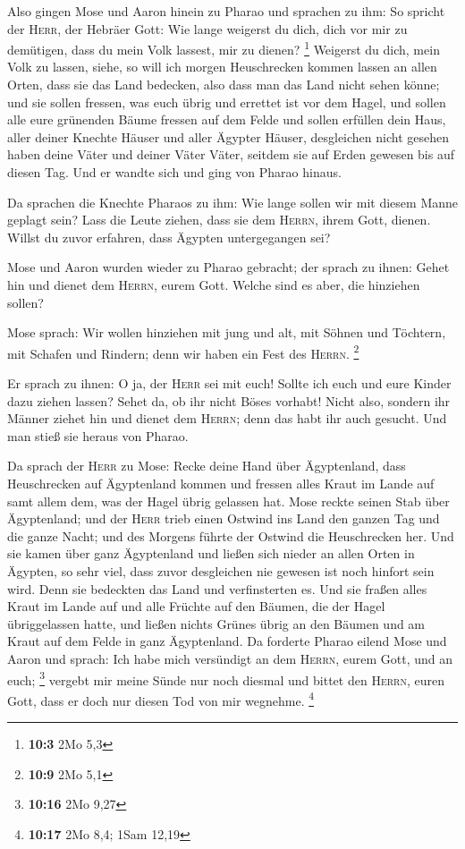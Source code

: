  Also gingen Mose und Aaron hinein zu Pharao und sprachen
zu ihm: So spricht der \textsc{Herr}, der Hebräer Gott: Wie lange
weigerst du dich, dich vor mir zu demütigen, dass du mein Volk lassest,
mir zu dienen? \footnote{\textbf{10:3} 2Mo 5,3}  Weigerst
du dich, mein Volk zu lassen, siehe, so will ich morgen Heuschrecken
kommen lassen an allen Orten,  dass sie das Land bedecken,
also dass man das Land nicht sehen könne; und sie sollen fressen, was
euch übrig und errettet ist vor dem Hagel, und sollen alle eure
grünenden Bäume fressen auf dem Felde  und sollen erfüllen
dein Haus, aller deiner Knechte Häuser und aller Ägypter Häuser,
desgleichen nicht gesehen haben deine Väter und deiner Väter Väter,
seitdem sie auf Erden gewesen bis auf diesen Tag. Und er wandte sich und
ging von Pharao hinaus.

 Da sprachen die Knechte Pharaos zu ihm: Wie lange sollen
wir mit diesem Manne geplagt sein? Lass die Leute ziehen, dass sie dem
\textsc{Herrn}, ihrem Gott, dienen. Willst du zuvor erfahren, dass
Ägypten untergegangen sei?

 Mose und Aaron wurden wieder zu Pharao gebracht; der
sprach zu ihnen: Gehet hin und dienet dem \textsc{Herrn}, eurem Gott.
Welche sind es aber, die hinziehen sollen?

 Mose sprach: Wir wollen hinziehen mit jung und alt, mit
Söhnen und Töchtern, mit Schafen und Rindern; denn wir haben ein Fest
des \textsc{Herrn}. \footnote{\textbf{10:9} 2Mo 5,1}

 Er sprach zu ihnen: O ja, der \textsc{Herr} sei mit
euch! Sollte ich euch und eure Kinder dazu ziehen lassen? Sehet da, ob
ihr nicht Böses vorhabt!  Nicht also, sondern ihr Männer
ziehet hin und dienet dem \textsc{Herrn}; denn das habt ihr auch
gesucht. Und man stieß sie heraus von Pharao.

 Da sprach der \textsc{Herr} zu Mose: Recke deine Hand
über Ägyptenland, dass Heuschrecken auf Ägyptenland kommen und fressen
alles Kraut im Lande auf samt allem dem, was der Hagel übrig gelassen
hat.  Mose reckte seinen Stab über Ägyptenland; und der
\textsc{Herr} trieb einen Ostwind ins Land den ganzen Tag und die ganze
Nacht; und des Morgens führte der Ostwind die Heuschrecken her.
 Und sie kamen über ganz Ägyptenland und ließen sich
nieder an allen Orten in Ägypten, so sehr viel, dass zuvor desgleichen
nie gewesen ist noch hinfort sein wird.  Denn sie
bedeckten das Land und verfinsterten es. Und sie fraßen alles Kraut im
Lande auf und alle Früchte auf den Bäumen, die der Hagel übriggelassen
hatte, und ließen nichts Grünes übrig an den Bäumen und am Kraut auf dem
Felde in ganz Ägyptenland.  Da forderte Pharao eilend
Mose und Aaron und sprach: Ich habe mich versündigt an dem
\textsc{Herrn}, eurem Gott, und an euch; \footnote{\textbf{10:16} 2Mo
  9,27}  vergebt mir meine Sünde nur noch diesmal und
bittet den \textsc{Herrn}, euren Gott, dass er doch nur diesen Tod von
mir wegnehme. \footnote{\textbf{10:17} 2Mo 8,4; 1Sam 12,19}

